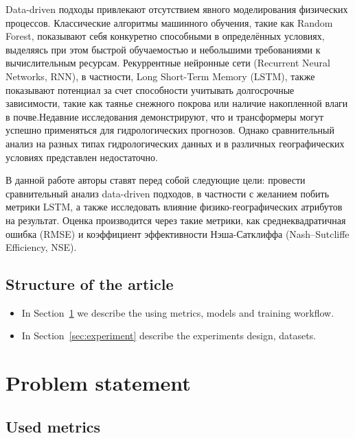 \documentclass{article}
\begin{document}
Data-driven подходы привлекают отсутствием явного моделирования физических процессов. Классические алгоритмы машинного обучения, такие как Random Forest, показывают себя конкуретно способными в определённых условиях, выделяясь при этом быстрой обучаемостью и небольшими требованиями к вычислительным ресурсам\cite{schoppaEvaluatingPerformanceRandom2020}. Рекуррентные нейронные сети (Recurrent Neural Networks, RNN), в частности, Long Short-Term Memory (LSTM), также показывают потенциал за счет способности учитывать долгосрочные зависимости, такие как таянье снежного покрова или наличие накопленной влаги в почве\cite{kratzertRainfallRunoffModelling2018, kratzertHESSOpinionsNever2024}.Недавние исследования демонстрируют, что и трансформеры могут успешно применяться для гидрологических прогнозов\cite{liInterpretableHybridDeep2024,liuProbingLimitHydrologic2023}. Однако сравнительный анализ на разных типах гидрологических данных и в различных географических условиях представлен недостаточно.

В данной работе авторы ставят перед собой следующие цели: провести сравнительный анализ data-driven подходов, в частности с желанием побить метрики LSTM, а также исследовать влияние физико-географических атрибутов на результат. Оценка производится через такие метрики, как среднеквадратичная ошибка (RMSE) и коэффициент эффективности Нэша-Сатклиффа (Nash–Sutcliffe Efficiency, NSE).
\subsection{Structure of the article}

\begin{itemize}
    \item In Section~\ref{sec:problem_statement} we describe the using metrics, models and training workflow.
    \item In Section~\ref{sec:experiment} describe the experiments design, datasets.
\end{itemize}

\section{Problem statement}
\label{sec:problem_statement}

\subsection{Used metrics}
\label{sec:problem_statement:metrics}
\end{document}
